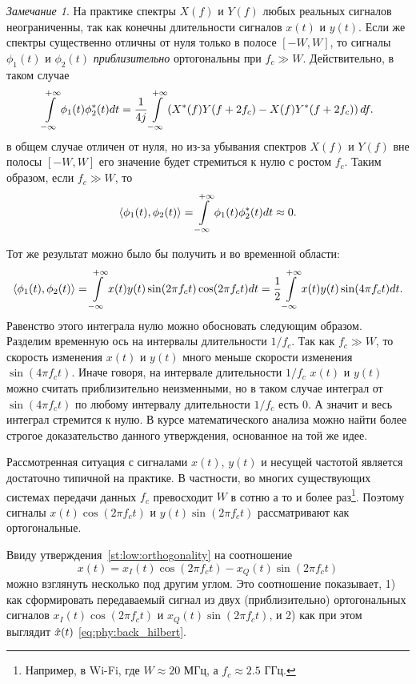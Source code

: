 \documentclass{book}
\numberwithin{theorem}{chapter}
\numberwithin{statement}{chapter}
\numberwithin{lemma}{chapter}
\theoremstyle{definition}
\numberwithin{task}{chapter}
\theoremstyle{remark}
\numberwithin{example}{chapter}
\theoremstyle{definition}
\numberwithin{definition}{chapter}
\theoremstyle{remark}
\newtheorem{note}{Замечание}
\theoremstyle{remark}
\numberwithin{lyrics}{section}
\begin{document}
\begin{note}
На практике спектры $X(f)$ и $Y(f)$ любых реальных сигналов неограниченны, так как конечны длительности сигналов $x(t)$ и $y(t)$. Если же спектры существенно отличны от нуля только в полосе $[-W, W]$, то сигналы $\phi_1(t)$ и $\phi_2(t)$ \textit{приблизительно} ортогональны при $f_c \gg W$. %
Действительно, в таком случае
$$
\int\limits_{-\infty}^{+\infty} \phi_1(t) \phi_2^*(t) dt = \frac{1}{4j} \int\limits_{-\infty}^{+\infty}\left(X^*(f)Y(f + 2f_c) - X(f)Y^*(f + 2f_c)\right) df.
$$
в общем случае отличен от нуля, но из-за убывания спектров $X(f)$ и $Y(f)$ вне полосы $[-W, W]$ его значение будет стремиться к нулю с ростом $f_c$. Таким образом, если $f_c \gg W$, то
$$
\langle \phi_1(t), \phi_2(t)\rangle = \int\limits_{-\infty}^{+\infty} \phi_1(t) \phi_2^*(t) dt \approx 0.
$$

Тот же результат можно было бы получить и во временной области:
\begin{gather*}
\langle \phi_1(t), \phi_2(t)\rangle = \int\limits_{-\infty}^{+\infty} x(t) y(t) \sin(2\pi f_c t) \cos(2 \pi f_c t) dt = \frac{1}{2}\int\limits_{-\infty}^{+\infty} x(t) y(t) \sin(4\pi f_c t) dt.
\end{gather*}
Равенство этого интеграла нулю можно обосновать следующим образом. Разделим временную ось на интервалы длительности $1/f_c$. Так как $f_c \gg W$, то скорость изменения $x(t)$ и $y(t)$ много меньше скорости изменения $\sin(4\pi f_c t)$. Иначе говоря, на интервале длительности $1/f_c$ $x(t)$ и $y(t)$ можно считать приблизительно неизменными, но в таком случае интеграл от $\sin(4\pi f_c t)$ по любому интервалу длительности $1/f_c$ есть 0. А значит и весь интеграл стремится к нулю. В курсе математического анализа можно найти более строгое доказательство данного утверждения, основанное на той же идее. 

Рассмотренная ситуация с сигналами $x(t)$, $y(t)$ и несущей частотой является достаточно типичной на практике. В частности, 
во многих существующих системах передачи данных $f_c$ превосходит $W$ в сотню а то и более раз\footnote{Например, в Wi-Fi, где $W \approx 20$ МГц, а $f_c \approx 2.5$ ГГц.}. Поэтому сигналы $x(t)\cos(2\pi f_c t)$ и $y(t)\sin(2\pi f_c t)$ рассматривают как ортогональные. 
\end{note}

Ввиду утверждения~\ref{st:low:orthogonality} на соотношение 
$$x(t) = x_{I}(t) \cos(2\pi f_c t) - x_Q(t) \sin(2 \pi f_c t)$$
можно взглянуть несколько под другим углом. Это соотношение показывает, 1) как сформировать передаваемый сигнал из двух (приблизительно) ортогональных сигналов $x_{I}(t) \cos(2\pi f_c t)$ и $x_Q(t) \sin(2 \pi f_c t)$, и 2) как при этом выглядит $\hat{x}(t)$ \eqref{eq:phy:back_hilbert}. 
\end{document}
